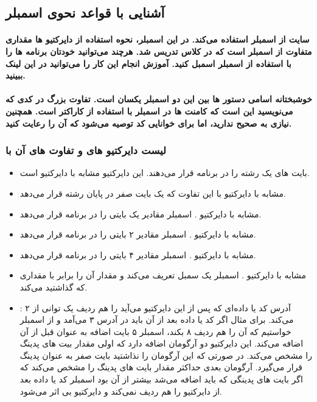\subsection{آشنایی با قواعد نحوی اسمبلر }
\paragraph{
سایت  از اسمبلر  استفاده می‌کند. در این اسمبلر، نحوه استفاده از دایرکتیو ها مقداری متفاوت از اسمبلر  است که در کلاس تدریس شد. هرچند می‌توانید خودتان برنامه ها را با استفاده از اسمبلر  اسمبل کنید. آموزش انجام این کار را می‌توانید در این لینک ببینید.
}

\paragraph{
خوشبختانه اسامی دستور ها بین این دو اسمبلر یکسان است. تفاوت بزرگ در کدی که می‌نویسید این است که کامنت ها در اسمبلر  با استفاده از کاراکتر  است. همچنین نیازی به  صحیح ندارید، اما برای خوانایی کد توصیه می‌شود که آن را رعایت کنید.
}

\subsubsection{لیست دایرکتیو های  و تفاوت های آن با }

\begin{itemize}
    \item {} بایت های یک رشته را در برنامه قرار می‌دهند. این دایرکتیو مشابه با دایرکتیو  است.
    \item {} مشابه با دایرکتیو  با این تفاوت که یک بایت صفر در پایان رشته قرار می‌دهد.
    \item {} مشابه با دایرکتیو . اسمبلر مقادیر یک بایتی را در برنامه قرار می‌دهد.
    \item {} مشابه با دایرکتیو . اسمبلر مقادیر ۲ بایتی را در برنامه قرار می‌دهد.
    \item {} مشابه با دایرکتیو . اسمبلر مقادیر ۴ بایتی را در برنامه قرار می‌دهد.
    \item {} مشابه با دایرکتیو . اسمبلر یک سمبل تعریف می‌کند و مقدار آن را برابر با مقداری که گذاشتید می‌کند.
    
    \item {}: آدرس کد یا داده‌ای که پس از این دایرکتیو می‌آید را هم ردیف یک توانی از ۲ می‌کند. برای مثال اگر کد یا داده بعد از آن باید در آدرس ۳ می‌آمد و از اسمبلر خواستیم که آن را هم ردیف ۸ بکند، اسمبلر ۵ بایت اضافه به عنوان  قبل از آن اضافه می‌کند. این دایرکتیو دو آرگومان اضافه دارد که اولی مقدار بیت های پدینگ را مشخص می‌کند. در صورتی که این آرگومان را نذاشتید بایت صفر به عنوان پدینگ قرار می‌گیرد. آرگومان بعدی حداکثر مقدار بایت های پدینگ را مشخص می‌کند که اگر بایت های پدینگی که باید اضافه می‌شد بیشتر از آن بود اسمبلر کد یا داده بعد از دایرکتیو را هم ردیف نمی‌کند و دایرکتیو بی اثر می‌شود.

\end{itemize}

